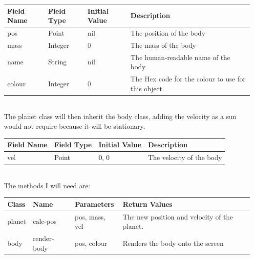 \begin{tabularx}{\linewidth}{l | l | l | X}
	Field Name & Field Type & Initial Value & Description \\ \hline
	pos	& Point		& nil		& The position of the body \\
	mass	& Integer	& 0		& The mass of the body \\
	name	& String	& nil 		& The human-readable name of the
							body \\
	colour	& Integer	& 0		& The Hex code for the colour to
							use for this object \\
\end{tabularx} \\

The planet class will then inherit the body class, adding the velocity as a sun
would not require because it will be stationary. \\

\begin{tabularx}{\linewidth}{ l | l | l | X } 
	Field Name & Field Type & Initial Value & Description \\ \hline
	vel	& Point		& 0, 0		& The velocity of the body \\
\end{tabularx} \\

The methods I will need are: \\

\begin{tabularx}{\linewidth}{l | l | l | X }
	Class & Name & Parameters & Return Values \\ \hline
	planet & calc-pos & pos, mass, vel & The new position and velocity of
	the planet. \\
	body & render-body & pos, colour & Renders the body onto the screen
\end{tabularx} \\


